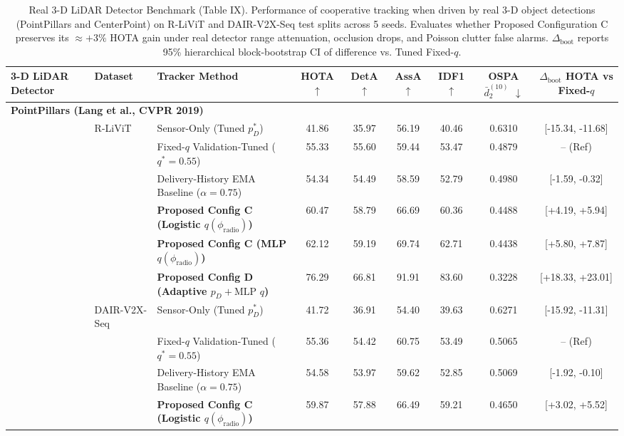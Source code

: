 \begin{table}[!t]
\caption{Real 3-D LiDAR Detector Benchmark (Table IX). Performance of cooperative tracking when driven by real 3-D object detections (PointPillars and CenterPoint) on R-LiViT and DAIR-V2X-Seq test splits across 5 seeds. Evaluates whether Proposed Configuration C preserves its $\approx +3\%$ HOTA gain under real detector range attenuation, occlusion drops, and Poisson clutter false alarms. $\Delta_{\text{boot}}$ reports 95\% hierarchical block-bootstrap CI of difference vs. Tuned Fixed-$q$.}
\label{tab:real_detector_benchmark}
\centering
\small
\setlength{\tabcolsep}{4.5pt}
\begin{tabular}{lllcccccc}
\toprule
3-D LiDAR Detector & Dataset & Tracker Method & HOTA $\uparrow$ & DetA $\uparrow$ & AssA $\uparrow$ & IDF1 $\uparrow$ & OSPA $\bar{d}_2^{(10)}$ $\downarrow$ & $\Delta_{\text{boot}}$ HOTA vs Fixed-$q$ \\
\midrule
\multicolumn{9}{l}{\textbf{PointPillars (Lang et al., CVPR 2019)}} \\
\midrule
 & R-LiViT & Sensor-Only (Tuned $p_D^*$) & 41.86 & 35.97 & 56.19 & 40.46 & 0.6310 & [-15.34, -11.68] \\
 &  & Fixed-$q$ Validation-Tuned ($q^*=0.55$) & 55.33 & 55.60 & 59.44 & 53.47 & 0.4879 & -- (Ref) \\
 &  & Delivery-History EMA Baseline ($\alpha=0.75$) & 54.34 & 54.49 & 58.59 & 52.79 & 0.4980 & [-1.59, -0.32] \\
 &  & \textbf{Proposed Config C (Logistic $q(\phi_{\text{radio}})$)} & 60.47 & 58.79 & 66.69 & 60.36 & 0.4488 & [+4.19, +5.94] \\
 &  & \textbf{Proposed Config C (MLP $q(\phi_{\text{radio}})$)} & 62.12 & 59.19 & 69.74 & 62.71 & 0.4438 & [+5.80, +7.87] \\
 &  & \textbf{Proposed Config D (Adaptive $p_D + \text{MLP } q$)} & 76.29 & 66.81 & 91.91 & 83.60 & 0.3228 & [+18.33, +23.01] \\
\midrule
 & DAIR-V2X-Seq & Sensor-Only (Tuned $p_D^*$) & 41.72 & 36.91 & 54.40 & 39.63 & 0.6271 & [-15.92, -11.31] \\
 &  & Fixed-$q$ Validation-Tuned ($q^*=0.55$) & 55.36 & 54.42 & 60.75 & 53.49 & 0.5065 & -- (Ref) \\
 &  & Delivery-History EMA Baseline ($\alpha=0.75$) & 54.58 & 53.97 & 59.62 & 52.85 & 0.5069 & [-1.92, -0.10] \\
 &  & \textbf{Proposed Config C (Logistic $q(\phi_{\text{radio}})$)} & 59.87 & 57.88 & 66.49 & 59.21 & 0.4650 & [+3.02, +5.52] \\

\end{tabular}
\end{table}
